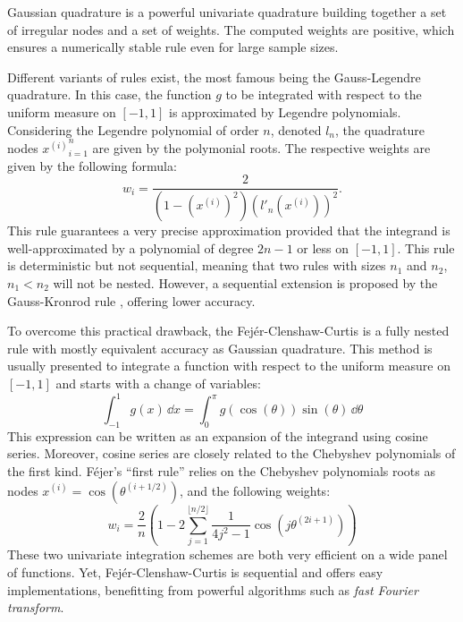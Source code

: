Gaussian quadrature is a powerful univariate quadrature building together a set of irregular nodes and a set of weights. 
The computed weights are positive, which ensures a numerically stable rule even for large sample sizes.

Different variants of rules exist, the most famous being the Gauss-Legendre quadrature. 
In this case, the function $g$ to be integrated with respect to the uniform measure on $[-1, 1]$ is approximated by Legendre polynomials.
Considering the Legendre polynomial of order $n$, denoted $l_n$, the quadrature nodes ${x^{(i)}}_{i=1}^n$ are given by the polymonial roots.
The respective weights are given by the following formula: 
\begin{equation}
    w_{i}={\frac {2}{\left(1-\left(x^{(i)}\right)^{2}\right)\left(l'_{n}(x^{(i)})\right)^{2}}}.
\end{equation}
This rule guarantees a very precise approximation provided that the integrand is well-approximated by a polynomial of degree $2n-1$ or less on $[-1, 1]$.
This rule is deterministic but not sequential, meaning that two rules with sizes $n_1$ and $n_2$, $n_1 < n_2$ will not be nested. 
However, a sequential extension is proposed by the Gauss-Kronrod rule , offering lower accuracy. 

To overcome this practical drawback, the Fejér-Clenshaw-Curtis is a fully nested rule with mostly equivalent accuracy as Gaussian quadrature.
This method is usually presented to integrate a function with respect to the uniform measure on $[-1, 1]$ and starts with a change of variables:
\begin{equation}
    \int_{-1}^{1} g(x) \, \dd x = \int_{0}^{\pi} g(\cos(\theta)) \sin(\theta) \, \dd \theta 
\end{equation}
This expression can be written as an expansion of the integrand using cosine series. 
Moreover, cosine series are closely related to the Chebyshev polynomials of the first kind. 
Féjer's ``first rule''  relies on the Chebyshev polynomials roots as nodes $x^{(i)} = \cos(\theta^{(i+1/2)})$, and the following weights:
\begin{equation}
    w_i=\frac{2}{n}\left(1-2\sum_{j=1}^{\lfloor n/2 \rfloor}\frac{1}{4j^2-1}\cos\left(j\theta^{(2i+1)}\right)\right)    
\end{equation}
These two univariate integration schemes are both very efficient on a wide panel of functions. 
Yet, Fejér-Clenshaw-Curtis is sequential and offers easy implementations, benefitting from powerful algorithms such as \textit{fast Fourier transform}. 

